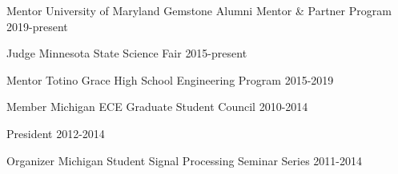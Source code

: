 

\begin{cventries}

  \cventry
    {Mentor} %
    {University of Maryland Gemstone Alumni Mentor \& Partner Program} %
    {} %
    {2019-present} %
    {}

  \cventry
    {Judge} %
    {Minnesota State Science Fair} %
    {} %
    {2015-present} %
    {}

  \cventry
    {Mentor} %
    {Totino Grace High School Engineering Program} %
    {} %
    {2015-2019} %
    {}

  \cventry
    {Member} %
    {Michigan ECE Graduate Student Council} %
    {} %
    {2010-2014} %
    {
      \begin{cvitems}
        \item{President 2012-2014}
      \end{cvitems}
    }

  \cventry
    {Organizer} %
    {Michigan Student Signal Processing Seminar Series} %
    {} %
    {2011-2014} %
    {}

\end{cventries}
